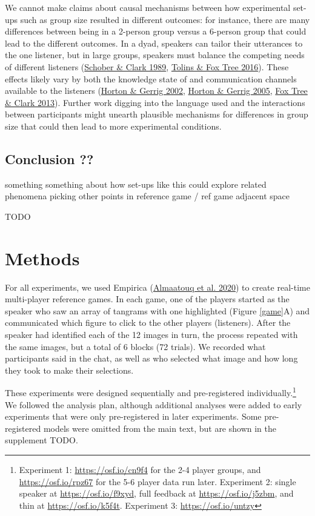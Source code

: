 \documentclass[
  english,
  a4paper,
]{article}
\begin{document}
We cannot make claims about causal mechanisms between how experimental set-ups such as group size resulted in different outcomes: for instance, there are many differences between being in a 2-person group versus a 6-person group that could lead to the different outcomes. In a dyad, speakers can tailor their utterances to the one listener, but in large groups, speakers must balance the competing needs of different listeners (\protect\hyperlink{ref-schober1989}{Schober \& Clark 1989}, \protect\hyperlink{ref-tolins2016}{Tolins \& Fox Tree 2016}). These effects likely vary by both the knowledge state of and communication channels available to the listeners (\protect\hyperlink{ref-horton2002}{Horton \& Gerrig 2002}, \protect\hyperlink{ref-horton2005}{Horton \& Gerrig 2005}, \protect\hyperlink{ref-fox-tree2013}{Fox Tree \& Clark 2013}). Further work digging into the language used and the interactions between participants might unearth plausible mechanisms for differences in group size that could then lead to more experimental conditions.

\hypertarget{conclusion}{%
\subsection{Conclusion ??}\label{conclusion}}

something something about how set-ups like this could explore related phenomena picking other points in reference game / ref game adjacent space

TODO

\hypertarget{methods}{%
\section{Methods}\label{methods}}

For all experiments, we used Empirica (\protect\hyperlink{ref-almaatouqEmpiricaVirtualLab2020}{Almaatouq et al. 2020}) to create real-time multi-player reference games. In each game, one of the players started as the speaker who saw an array of tangrams with one highlighted (Figure \ref{game}A) and communicated which figure to click to the other players (listeners). After the speaker had identified each of the 12 images in turn, the process repeated with the same images, but a total of 6 blocks (72 trials). We recorded what participants said in the chat, as well as who selected what image and how long they took to make their selections.

These experiments were designed sequentially and pre-registered individually.\footnote{Experiment 1: \url{https://osf.io/cn9f4} for the 2-4 player groups, and \url{https://osf.io/rpz67} for the 5-6 player data run later. Experiment 2: single speaker at \url{https://osf.io/f9xyd}, full feedback at \url{https://osf.io/j5zbm}, and thin at \url{https://osf.io/k5f4t}. Experiment 3: \url{https://osf.io/untzy}} We followed the analysis plan, although additional analyses were added to early experiments that were only pre-registered in later experiments. Some pre-registered models were omitted from the main text, but are shown in the supplement TODO.
\end{document}
